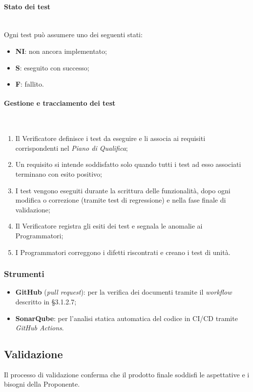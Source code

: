 \documentclass[10pt, letterpaper]{article}
\newcommand{\trisubsection}[1]{\paragraph{#1}\mbox{}\\}
\begin{document}
\trisubsection{Stato dei test}
Ogni test può assumere uno dei seguenti stati:
\begin{itemize}
    \item \textbf{NI}: non ancora implementato;
    \item \textbf{S}: eseguito con successo;
    \item \textbf{F}: fallito.
\end{itemize}

\trisubsection{Gestione e tracciamento dei test}
\begin{enumerate}
    \item Il Verificatore definisce i test da eseguire e li associa ai requisiti corrispondenti nel \textit{Piano di Qualifica};
    \item Un requisito si intende soddisfatto solo quando tutti i test ad esso associati terminano con esito positivo;
    \item I test vengono eseguiti durante la scrittura delle funzionalità, dopo ogni modifica o correzione (tramite test di regressione) e nella fase finale di validazione;
    \item Il Verificatore registra gli esiti dei test e segnala le anomalie ai Programmatori;
    \item I Programmatori correggono i difetti riscontrati e creano i test di unità.
\end{enumerate}

\subsubsection{Strumenti}
\begin{itemize}
    \item \textbf{GitHub} (\textit{pull request}): per la verifica dei documenti tramite il \textit{workflow} descritto in §3.1.2.7;
    \item \textbf{SonarQube}: per l'analisi statica automatica del codice in CI/CD tramite \textit{GitHub Actions}.
\end{itemize}


\subsection{Validazione}
Il processo di validazione conferma che il prodotto finale soddisfi le aspettative e i bisogni della Proponente.
\end{document}

